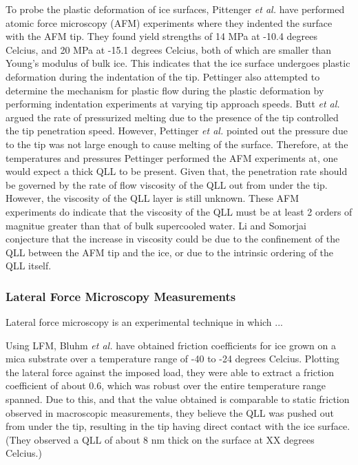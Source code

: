 To probe the plastic deformation of ice surfaces, Pittenger \textit{et
  al.} have performed atomic force microscopy (AFM) experiments where
they indented the surface with the AFM tip.\cite{Butt2000,
  Pittenger2001,Bluhm2000} They found yield strengths of 14 MPa at -10.4
degrees Celcius, and 20 MPa at -15.1 degrees Celcius, both of which
are smaller than Young's modulus of bulk ice. This indicates that the
ice surface undergoes plastic deformation during the indentation of
the tip. Pettinger also attempted to determine the mechanism for
plastic flow during the plastic deformation by performing indentation
experiments at varying tip approach speeds. Butt \textit{et al.}
argued the rate of pressurized melting due to the presence of the tip
controlled the tip penetration speed.\cite{Butt2000} However, Pettinger
\textit{et al.} pointed out the pressure due to the tip was not large
enough to cause melting of the surface.\cite{Pittenger2001} Therefore, at the
temperatures and pressures Pettinger performed the AFM experiments at,
one would expect a thick QLL to be present. Given that, the
penetration rate should be governed by the rate of flow viscosity of
the QLL out from under the tip. However, the viscosity of the QLL
layer is still unknown. These AFM experiments do indicate that the
viscosity of the QLL must be at least 2 orders of magnitue greater
than that of bulk supercooled water. Li and Somorjai conjecture that
the increase in viscosity could be due to the confinement of the QLL
between the AFM tip and the ice, or due to the intrinsic ordering of
the QLL itself.



\subsubsection{Lateral Force Microscopy Measurements}
Lateral force microscopy is an experimental technique in which ...

Using LFM, Bluhm \textit{et al.} have obtained friction coefficients
for ice grown on a mica substrate over a temperature range of -40 to
-24 degrees Celcius.\cite{Bluhm2000} Plotting the lateral force against the
imposed load, they were able to extract a friction coefficient of
about 0.6, which was robust over the entire temperature range
spanned. Due to this, and that the value obtained is comparable to
static friction observed in macroscopic measurements, they believe the
QLL was pushed out from under the tip, resulting in the tip having
direct contact with the ice surface. (They observed a QLL of about 8 nm thick
on the surface at XX degrees Celcius.) 

